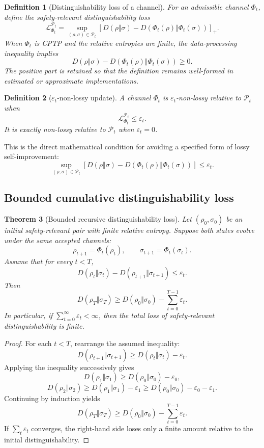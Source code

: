 \documentclass[11pt]{article}
\newtheorem{theorem}{Theorem}[section]
\newtheorem{definition}[theorem]{Definition}
\newcommand{\Pcal}{\mathcal{P}}
\newcommand{\Lcal}{\mathcal{L}}
\newcommand{\1}{\mathbf{1}}
\newcommand{\eps}{\varepsilon}
\begin{document}
\begin{definition}[Distinguishability loss of a channel]
For an admissible channel \(\Phi_t\), define the safety-relevant distinguishability loss
\[
\Lcal^{\Pcal_t}_{\Phi_t}
=
\sup_{(\rho,\sigma)\in\Pcal_t}
\left[
D(\rho\Vert\sigma)
-
D(\Phi_t(\rho)\Vert\Phi_t(\sigma))
\right]_+.
\]
When \(\Phi_t\) is CPTP and the relative entropies are finite, the data-processing inequality implies
\[
D(\rho\Vert\sigma)
-
D(\Phi_t(\rho)\Vert\Phi_t(\sigma))
\ge0.
\]
The positive part is retained so that the definition remains well-formed in estimated or approximate implementations.
\end{definition}

\begin{definition}[\(\eps_t\)-non-lossy update]
A channel \(\Phi_t\) is \(\eps_t\)-non-lossy relative to \(\Pcal_t\) when
\[
\Lcal^{\Pcal_t}_{\Phi_t}\le\eps_t.
\]
It is exactly non-lossy relative to \(\Pcal_t\) when \(\eps_t=0\).
\end{definition}

This is the direct mathematical condition for avoiding a specified form of lossy self-improvement:
\[
\boxed{
\sup_{(\rho,\sigma)\in\Pcal_t}
\left[
D(\rho\Vert\sigma)
-
D(\Phi_t(\rho)\Vert\Phi_t(\sigma))
\right]
\le
\eps_t.
}
\]

\subsection{Bounded cumulative distinguishability loss}

\begin{theorem}[Bounded recursive distinguishability loss]
\label{thm:bounded_relative_entropy_loss}
Let \((\rho_0,\sigma_0)\) be an initial safety-relevant pair with finite relative entropy.  Suppose both states evolve under the same accepted channels:
\[
\rho_{t+1}=\Phi_t(\rho_t),
\qquad
\sigma_{t+1}=\Phi_t(\sigma_t).
\]
Assume that for every \(t<T\),
\[
D(\rho_t\Vert\sigma_t)
-
D(\rho_{t+1}\Vert\sigma_{t+1})
\le
\eps_t.
\]
Then
\[
D(\rho_T\Vert\sigma_T)
\ge
D(\rho_0\Vert\sigma_0)
-
\sum_{t=0}^{T-1}\eps_t.
\]
In particular, if \(\sum_{t=0}^{\infty}\eps_t<\infty\), then the total loss of safety-relevant distinguishability is finite.
\end{theorem}

\begin{proof}
For each \(t<T\), rearrange the assumed inequality:
\[
D(\rho_{t+1}\Vert\sigma_{t+1})
\ge
D(\rho_t\Vert\sigma_t)-\eps_t.
\]
Applying the inequality successively gives
\[
D(\rho_1\Vert\sigma_1)
\ge
D(\rho_0\Vert\sigma_0)-\eps_0,
\]
\[
D(\rho_2\Vert\sigma_2)
\ge
D(\rho_1\Vert\sigma_1)-\eps_1
\ge
D(\rho_0\Vert\sigma_0)-\eps_0-\eps_1.
\]
Continuing by induction yields
\[
D(\rho_T\Vert\sigma_T)
\ge
D(\rho_0\Vert\sigma_0)-\sum_{t=0}^{T-1}\eps_t.
\]
If \(\sum_t\eps_t\) converges, the right-hand side loses only a finite amount relative to the initial distinguishability.
\end{proof}
\end{document}
